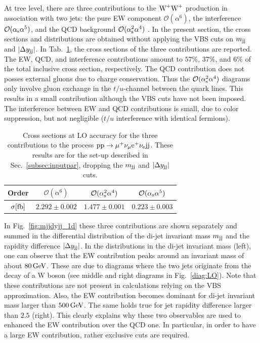 At tree level, there are three contributions to the $\text{W}^+\text{W}^+$ production in association with two jets: the pure EW component $\mathcal{O}(\alpha^6)$, the interference $\mathcal{O}(\alpha_\text{s}\alpha^5)$, and the QCD background $\mathcal{O}(\alpha_\text{s}^2\alpha^4)$ .
In the present section, the cross sections and distributions are obtained without applying the VBS cuts on $m_{\text{j}\text{j}}$ and $|\Delta y_{\text{j}\text{j}}|$.
In Tab.~\ref{tab:LOscanXsec}, the cross sections of the three contributions are reported.
The EW, QCD, and interference contributions amount to $57\%$, $37\%$, and $6\%$ of the total inclusive cross section, respectively.
The QCD contribution does not posses external gluons due to charge conservation.
Thus the $\mathcal{O}(\alpha_\text{s}^2\alpha^4)$ diagrams only involve gluon exchange in the $t/u$-channel between the quark lines.
This results in a small contribution although the VBS cuts have not been imposed.
The interference between EW and QCD contributions is small, due to color suppression, but not negligible ($t/u$ interference with identical fermions).

\begin{table}[h!]
    \centering
    \begin{tabular}{c|c|c|c}
        Order & $\mathcal{O}(\alpha^6)$ & $\mathcal{O}(\alpha_\text{s}^2\alpha^4)$ & $\mathcal{O}(\alpha_\text{s}\alpha^5)$ \\
        \hline
        \hline
        $\sigma[\rm{fb}]$ & $ 2.292 \pm 0.002 $ & $ 1.477 \pm 0.001 $ & $ 0.223 \pm 0.003 $ \\
    \end{tabular}
    \caption{\label{tab:LOscanXsec} Cross sections at LO accuracy for the three contributions to the process ${\rm p}{\rm p}\to\mu^+\nu_\mu{\rm e}^+\nu_{\rm e}{\rm j}{\rm j}$.
    These results are for the set-up described in Sec.~\ref{subsec:inputpar}, dropping the $m_{\text{j}\text{j}}$ and $|\Delta y_{\text{j}\text{j}}|$ cuts.}
\end{table}

In Fig.~\ref{fig:mjjdyjj_1d} these three contributions are shown separately and summed in the differential distribution of the di-jet invariant mass $m_{\text{j}\text{j}}$ and the rapidity difference $|\Delta y_{\text{j}\text{j}}|$.
In the distributions in the di-jet invariant mass (left), one can observe that the EW contribution peaks around an invariant mass of about $80\,\text{GeV}$.
These are due to diagrams where the two jets originate from the decay of a W boson (see middle and right diagrams in Fig.~\ref{diag:LO}).
Note that these contributions are not present in calculations relying on the VBS approximation.
Also, the EW contribution becomes dominant for di-jet invariant mass larger than $500\,\text{GeV}$.
The same holds true for jet rapidity difference larger than $2.5$ (right).
This clearly explains why these two observables are used to enhanced the EW contribution over the QCD one.
In particular, in order to have a large EW contribution, rather exclusive cuts are required.

